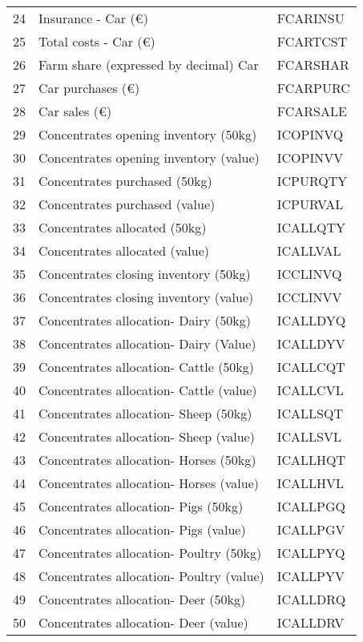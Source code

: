 \documentclass{article}\usepackage{graphicx, color}
\begin{document}
\begin{flushleft}
\begin{table}[ht]
\begin{center}
\begin{tabular}{rll}
  24 & Insurance - Car                 (€) & FCARINSU \\ 
  25 & Total costs - Car               (€) & FCARTCST \\ 
  26 & Farm share (expressed by decimal) Car & FCARSHAR \\ 
  27 & Car purchases                   (€) & FCARPURC \\ 
  28 & Car sales                       (€) & FCARSALE \\ 
  29 & Concentrates opening inventory (50kg) & ICOPINVQ \\ 
  30 & Concentrates opening inventory (value) & ICOPINVV \\ 
  31 & Concentrates purchased         (50kg) & ICPURQTY \\ 
  32 & Concentrates purchased         (value) & ICPURVAL \\ 
  33 & Concentrates allocated         (50kg) & ICALLQTY \\ 
  34 & Concentrates allocated         (value) & ICALLVAL \\ 
  35 & Concentrates closing inventory (50kg) & ICCLINVQ \\ 
  36 & Concentrates closing inventory (value) & ICCLINVV \\ 
  37 & Concentrates allocation- Dairy (50kg) & ICALLDYQ \\ 
  38 & Concentrates allocation- Dairy (Value) & ICALLDYV \\ 
  39 & Concentrates allocation- Cattle (50kg) & ICALLCQT \\ 
  40 & Concentrates allocation- Cattle (value) & ICALLCVL \\ 
  41 & Concentrates allocation- Sheep (50kg) & ICALLSQT \\ 
  42 & Concentrates allocation- Sheep (value) & ICALLSVL \\ 
  43 & Concentrates allocation- Horses (50kg) & ICALLHQT \\ 
  44 & Concentrates allocation- Horses (value) & ICALLHVL \\ 
  45 & Concentrates allocation- Pigs  (50kg) & ICALLPGQ \\ 
  46 & Concentrates allocation- Pigs  (value) & ICALLPGV \\ 
  47 & Concentrates allocation- Poultry (50kg) & ICALLPYQ \\ 
  48 & Concentrates allocation- Poultry (value) & ICALLPYV \\ 
  49 & Concentrates allocation- Deer  (50kg) & ICALLDRQ \\ 
  50 & Concentrates allocation- Deer (value) & ICALLDRV \\ 
   \hline
\end{tabular}
\end{center}
\end{table}



\end{flushleft}
\end{document}
